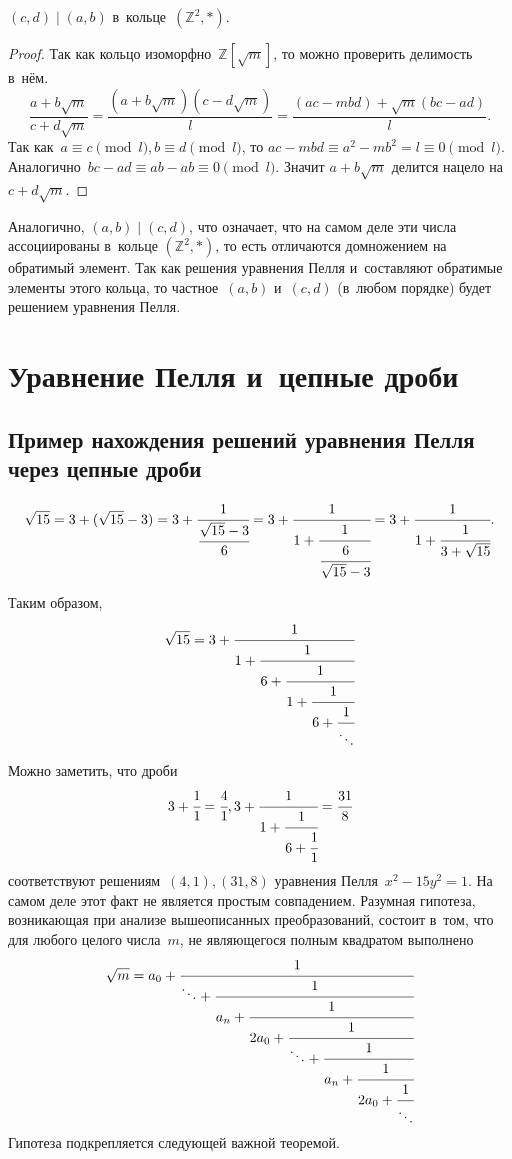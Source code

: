 \documentclass{article}
\begin{document}
\begin{claim}
  $(c, d) \mid (a, b)$ в~кольце~$(\mathbb{Z}^2, \ast)$.
\end{claim}
\begin{proof}
  Так как кольцо изоморфно~$\mathbb{Z}[\sqrt{m}]$, то можно проверить делимость
  в~нём.
  $$ \frac{a + b\sqrt{m}}{c + d\sqrt{m}} = \frac{(a + b\sqrt{m})(c - d\sqrt{m})}
  {l} = \frac{(ac - mbd) + \sqrt{m}(bc - ad)}{l}.$$
  Так как~$a \equiv c\pmod l, b \equiv d\pmod l$, то $ac - mbd \equiv a^2 - mb^2
  = l \equiv 0\pmod l$. Аналогично~$bc - ad \equiv ab - ab \equiv 0\pmod l$.
  Значит $a + b\sqrt{m}$ делится нацело на $c + d\sqrt{m}$.
\end{proof}

Аналогично, $(a, b) \mid (c, d)$, что означает, что на самом деле эти числа
ассоциированы в~кольце $(\mathbb{Z}^2, \ast)$, то есть отличаются домножением
на обратимый элемент. Так как решения уравнения Пелля и~составляют обратимые
элементы этого кольца, то частное~$(a, b)$ и~$(c, d)$ (в~любом порядке) будет
решением уравнения Пелля.

\section{Уравнение Пелля и~цепные дроби}

\subsection{Пример нахождения решений уравнения Пелля через цепные дроби}
\[
\sqrt{15} =
3 + (\sqrt{15} - 3) =
3 + \cfrac{1}{\cfrac{\sqrt{15}-3}{6}} =
3 + \cfrac{1}{1 + \cfrac{1}{\cfrac{6}{\sqrt{15}-3}}} =
3 + \cfrac{1}{1 + \cfrac{1}{3 + \sqrt{15}}}.
\]

Таким образом,
\[
  \sqrt{15} =
  3 + \cfrac{1}{1 + \cfrac{1}{6 + \cfrac{1}{1 + \cfrac{1}
  {6 + \cfrac{1}{\ddots}}}}}
\]

Можно заметить, что дроби
\[
  3 + \cfrac{1}{1} = \cfrac{4}{1},
  3 + \cfrac{1}{1 + \cfrac{1}{6 + \cfrac{1}{1}}} = \cfrac{31}{8}
\]
соответствуют решениям~$(4, 1), (31, 8)$ уравнения Пелля~$x^2 - 15y^2 = 1$.
На самом деле этот факт не является простым совпадением. Разумная гипотеза,
возникающая при анализе вышеописанных преобразований, состоит в~том, что для
любого целого числа~$m$, не являющегося полным квадратом выполнено
\[
\sqrt{m} = a_0 + \cfrac{1}{\ddots + \cfrac{1}{a_n +
\cfrac{1}{2a_0 + \cfrac{1}{\ddots + \cfrac{1}{a_n +
\cfrac{1}{2a_0 + \cfrac{1}{\ddots}}}}}}}
\]
Гипотеза подкрепляется следующей важной теоремой.
\end{document}
